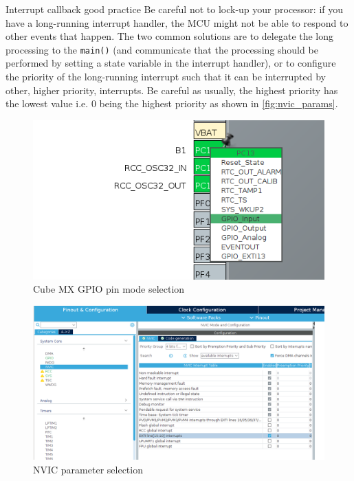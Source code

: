\begin{bclogo}[couleur = gray!20, arrondi = 0.2, logo=\bcinfo]{Interrupt callback good practice}
Be careful not to lock-up your processor: if you have a long-running interrupt handler, the MCU might not be able to respond to other events that happen.
The two common solutions are to delegate the long processing to the \texttt{main()} (and communicate that the processing should be performed by setting a state variable in the interrupt handler), or to configure the priority of the long-running interrupt such that it can be interrupted by other, higher priority, interrupts. Be careful as usually, the highest priority has the lowest value i.e. 0 being the highest priority as shown in \autoref{fig:nvic_params}.
\end{bclogo}

\begin{figure}[h]
    \centering
    \includegraphics[scale=0.4]{figures/gpio_exti_select.png}
    \caption{Cube MX GPIO pin mode selection}
    \label{fig:gpio_exti_select}
\end{figure}

\begin{figure}[h]
    \centering
    \includegraphics[scale=0.35]{figures/nvic_exti_select.png}
    \caption{NVIC parameter selection}
    \label{fig:nvic_params}
\end{figure}


